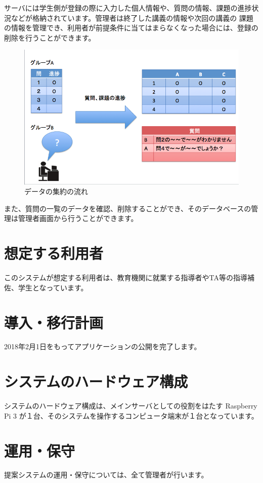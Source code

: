 \documentclass[a4j,titlepage]{ujarticle}
\begin{document}
サーバには学生側が登録の際に入力した個人情報や、質問の情報、課題の進捗状況などが格納されています。管理者は終了した講義の情報や次回の講義の
課題の情報を管理でき、利用者が前提条件に当てはまらなくなった場合には、登録の削除を行うことができます。
\begin{figure}[h]

\centering
   \includegraphics[width=13cm]{ui.png}
  \caption{データの集約の流れ}
\end{figure}

また、質問の一覧のデータを確認、削除することができ、そのデータベースの管理は管理者画面から行うことができます。

\section{想定する利用者}
このシステムが想定する利用者は、教育機関に就業する指導者やTA等の指導補佐、学生となっています。 %

\section{導入・移行計画}
2018年2月1日をもってアプリケーションの公開を完了します。

\section{システムのハードウェア構成}
システムのハードウェア構成は、メインサーバとしての役割をはたす Raspberry Pi 3 が１台、そのシステムを操作するコンピュータ端末が１台となっています。 %

\section{運用・保守}
提案システムの運用・保守については、全て管理者が行います。 %
\end{document}
